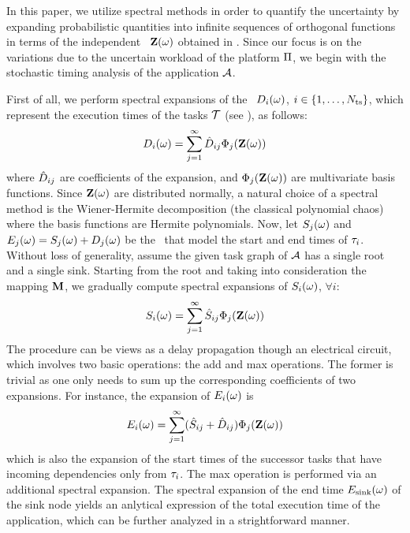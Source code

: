 In this paper, we utilize spectral methods in order to quantify the uncertainty by expanding probabilistic quantities into infinite sequences of orthogonal functions in terms of the independent \rvs\ $\mathbf{Z}(\omega)$ obtained in . Since our focus is on the variations due to the uncertain workload of the platform $\Pi$, we begin with the stochastic timing analysis of the application $\mathcal{A}$.

First of all, we perform spectral expansions of the \rvs\ $D_i(\omega)$, $i \in \{ 1, \dots, {N_\text{ts}} \}$, which represent the execution times of the tasks $\mathcal{T}$ (see ), as follows:
\[
  D_i(\omega) = \sum_{j = 1}^\infty \hat{D}_{ij} \Phi_j(\mathbf{Z}(\omega))
\]
where $\hat{D}_{ij}$ are coefficients of the expansion, and $\Phi_j(\mathbf{Z}(\omega))$ are multivariate basis functions. Since $\mathbf{Z}(\omega)$ are distributed normally, a natural choice of a spectral method is the Wiener-Hermite decomposition (the classical polynomial chaos) where the basis functions are Hermite polynomials. Now, let $S_j(\omega)$ and $E_j(\omega) = S_j(\omega) + D_j(\omega)$ be the \rvs\ that model the start and end times of $\tau_i$. Without loss of generality, assume the given task graph of $\mathcal{A}$ has a single root and a single sink. Starting from the root and taking into consideration the mapping $\mathbf{M}$, we gradually compute spectral expansions of $S_i(\omega)$, $\forall i$:
\[
  S_i(\omega) = \sum_{j = 1}^\infty \hat{S}_{ij} \Phi_j(\mathbf{Z}(\omega))
\]
The procedure can be views as a delay propagation though an electrical circuit, which involves two basic operations: the add and max operations. The former is trivial as one only needs to sum up the corresponding coefficients of two expansions. For instance, the expansion of $E_i(\omega)$ is
\[
  E_i(\omega) = \sum_{j = 1}^\infty (\hat{S}_{ij} + \hat{D}_{ij}) \Phi_j(\mathbf{Z}(\omega))
\]
which is also the expansion of the start times of the successor tasks that have incoming dependencies only from $\tau_i$. The max operation is performed via an additional spectral expansion. The spectral expansion of the end time $E_\text{sink}(\omega)$ of the sink node yields an anlytical expression of the total execution time of the application, which can be further analyzed in a strightforward manner.
